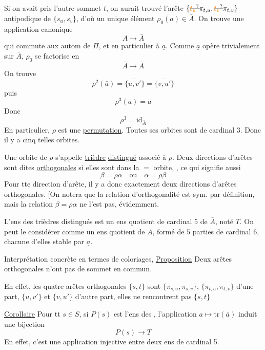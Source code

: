 Si on avait pris l'autre sommet $t$, on aurait trouvé l'arête $\{\deleted{\unsure{t_u}}\pi_{t,u},\deleted{\unsure{t_v}}\pi_{t,v}\}$ antipodique de $\{s_u,s_v\}$, d'où un unique élément $\rho_0(a)\in\bar A$. On trouve  une application canonique
\[
 A\longrightarrow\bar A
\]
qui commute aux autom de $\Pi$, et en particulier à $\underline a$. Comme $\underline a$ opère trivialement sur $\bar A$, \deleted{\unsure{$\exists$}} $\rho_0$ se factorise en
\[
\bar A\longrightarrow\bar A
\]
On trouve
\[
\rho^2(\bar a)=\overline{\{u,v'\}}=\overline{\{v,u'\}}
\]
puis
\[
\rho^3(\bar a)=\bar a
\]
Donc
\[
\rho^3=\mathrm{id}_{\bar A}
\]
En particulier, $\rho$ est une \uline{permutation}. Toutes ses orbites sont de cardinal 3. Donc il y a cinq telles orbites.

Une orbite de $\rho$ s'appelle \uline{trièdre} \uline{distingué}  associé à $\rho$. Deux directions d'arêtes \inserted{$\alpha,\beta$} sont dites \uline{orthogonales} si elles sont  dans la $=$ orbite, , ce qui signifie aussi
\[
\beta=\rho\alpha\quad\text{ou}\quad\alpha=\rho\beta
\]
Pour tte  direction d'arête, il y a donc exactement deux directions d'arêtes orthogonales. [On notera que la relation d'orthogonalité est sym. par définition, mais la relation $\beta=\rho\alpha$ \deleted{\unsure{$\alpha$}}  ne l'est pas, évidemment.\unsure{]}

L'ens des trièdres distingués est un ens quotient de cardinal $5$ de $\bar A$, noté  $T$.  On peut le considérer comme un ens quotient de $A$, formé de $5$ parties de cardinal $6$, chacune d'elles stable par $\underline a$.

Interprétation concrète en termes de coloriages,
\uline{Proposition}  Deux arêtes orthogonales n'ont pas de sommet en commun.

En effet, les quatre arêtes orthogonales  $\{s,t\}$ sont $\{\pi_{s,u},\pi_{s,v}\}$,  $\{\pi_{t,u},\pi_{t,v}\}$  d'une part, $\{u,v'\}$ et $\{v,u'\}$ d'autre part, elles ne rencontrent pas $\{s,t\}$

\uline{Corollaire} Pour tt $s\in S$, si $P(s)$ est l'ens des  , l'application $a\mapsto\mathrm{tr}(\bar a)$ induit une bijection
\[
P(s)\longrightarrow T
\]
En effet, c'est une application injective entre deux ens de cardinal 5.

